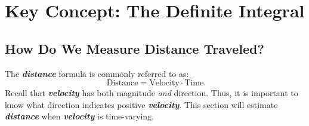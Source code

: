 \chapter{Key Concept: The Definite Integral}

\section{How Do We Measure Distance Traveled?}
The \textbf{\textit{distance}} formula is commonly referred to as:
%
\begin{equation}
\text{Distance} = \text{Velocity} \cdot \text{Time}
\end{equation}
%
Recall that \textbf{\textit{velocity}} has both magnitude \textit{and} direction. Thus, it is important to know what direction indicates positive \textbf{\textit{velocity}}. This section will estimate \textbf{\textit{distance}} when \textbf{\textit{velocity}} is time-varying.

